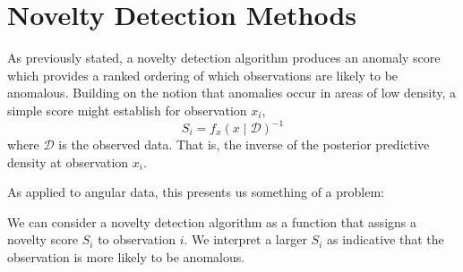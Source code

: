 \section{Novelty Detection Methods\label{sec:novelty}}
As previously stated, a novelty detection algorithm produces an anomaly score 
    which provides a ranked ordering of which observations are likely to be 
    anomalous. Building on the notion that anomalies occur in areas of low 
    density, a simple score might establish for observation $x_i$, 
    \[S_i = f_{x}(x\mid\mathcal{D})^{-1}\]
    where $\mathcal{D}$ is the observed data.  That is, the inverse of the 
    posterior predictive density at observation $x_i$.  
    
    
    
    
    
    As applied to angular data, this presents
    us something of a problem:  





We can consider a novelty detection algorithm as a function that assigns a
    novelty score $S_i$ to observation $i$.  We interpret a larger $S_i$
    as indicative that the observation is more likely to be anomalous.

